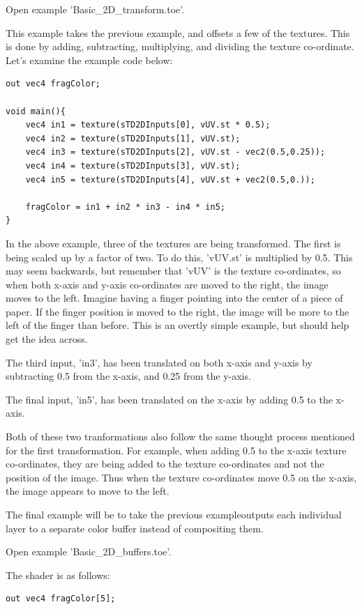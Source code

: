\begin{fullwidth}
Open example 'Basic\_2D\_transform.toe'.

This example takes the previous example, and offsets a few of the textures. This is done by adding, subtracting, multiplying, and dividing the texture co-ordinate. Let's examine the example code below:

\begin{lstlisting}
out vec4 fragColor;

void main(){
	vec4 in1 = texture(sTD2DInputs[0], vUV.st * 0.5);
	vec4 in2 = texture(sTD2DInputs[1], vUV.st);
	vec4 in3 = texture(sTD2DInputs[2], vUV.st - vec2(0.5,0.25));
	vec4 in4 = texture(sTD2DInputs[3], vUV.st);
	vec4 in5 = texture(sTD2DInputs[4], vUV.st + vec2(0.5,0.));

	fragColor = in1 + in2 * in3 - in4 * in5;
}
\end{lstlisting}

In the above example, three of the textures are being transformed. The first is being scaled up by a factor of two. To do this, 'vUV.st' is multiplied by 0.5. This may seem backwards, but remember that 'vUV' is the texture co-ordinates, so when both x-axis and y-axis co-ordinates are moved to the right, the image moves to the left. Imagine having a finger pointing into the center of a piece of paper. If the finger position is moved to the right, the image will be more to the left of the finger than before. This is an overtly simple example, but should help get the idea across.

The third input, 'in3', has been translated on both x-axis and y-axis by subtracting 0.5 from the x-axis, and 0.25 from the y-axis.

The final input, 'in5', has been translated on the x-axis by adding 0.5 to the x-axis.

Both of these two tranformations also follow the same thought process mentioned for the first transformation. For example, when adding 0.5 to the x-axis texture co-ordinates, they are being added to the texture co-ordinates and not the position of the image. Thus when the texture co-ordinates move 0.5 on the x-axis, the image appears to move to the left.

The final example will be to take the previous exampleoutputs each individual layer to a separate color buffer instead of compositing them.

Open example 'Basic\_2D\_buffers.toe'.

The shader is as follows:

\begin{lstlisting}
out vec4 fragColor[5];


\end{lstlisting}
\end{fullwidth}
